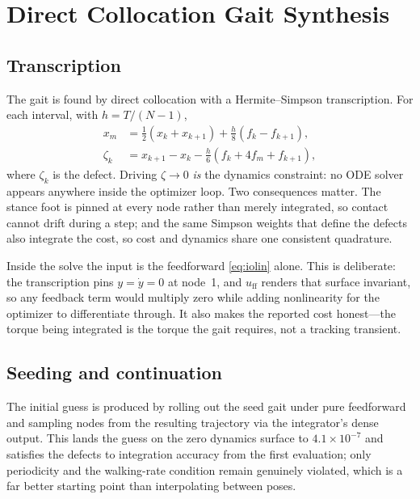 \documentclass[10pt,conference]{IEEEtran}
\begin{document}
\section{Direct Collocation Gait Synthesis}

\subsection{Transcription}

The gait is found by direct collocation with a Hermite--Simpson transcription.
For each interval, with $h = T/(N-1)$,
%
\begin{align}
x_m &= \tfrac{1}{2}(x_k + x_{k+1}) + \tfrac{h}{8}\left(f_k - f_{k+1}\right), \label{eq:hsmid}\\
\zeta_k &= x_{k+1} - x_k - \tfrac{h}{6}\left(f_k + 4f_m + f_{k+1}\right), \label{eq:hsdef}
\end{align}
%
where $\zeta_k$ is the defect. Driving $\zeta \to 0$ \emph{is} the dynamics
constraint: no ODE solver appears anywhere inside the optimizer loop. Two
consequences matter. The stance foot is pinned at every node rather than merely
integrated, so contact cannot drift during a step; and the same Simpson weights
that define the defects also integrate the cost, so cost and dynamics share one
consistent quadrature.

Inside the solve the input is the feedforward \eqref{eq:iolin} alone. This is
deliberate: the transcription pins $y = \dot y = 0$ at node~1, and
$u_{\mathrm{ff}}$ renders that surface invariant, so any feedback term would
multiply zero while adding nonlinearity for the optimizer to differentiate
through. It also makes the reported cost honest---the torque being integrated is
the torque the gait requires, not a tracking transient.

\subsection{Seeding and continuation}

The initial guess is produced by rolling out the seed gait under pure
feedforward and sampling nodes from the resulting trajectory via the
integrator's dense output. This lands the guess on the zero dynamics surface to
$4.1\times10^{-7}$ and satisfies the defects to integration accuracy from the
first evaluation; only periodicity and the walking-rate condition remain
genuinely violated, which is a far better starting point than interpolating
between poses.
\end{document}
